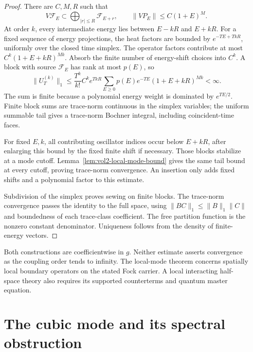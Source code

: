 \begin{proof}
There are \(C,M,R\) such that
\[
 V\mathcal F_E\subset\bigoplus_{|r|\leq R}\mathcal F_{E+r},
 \qquad\|VP_E\|\leq C(1+E)^M.
\]
At order \(k\), every intermediate energy lies between
\(E-kR\) and \(E+kR\). For a fixed sequence of energy projections,
the heat factors are bounded by \(e^{-TE+TkR}\), uniformly over
the closed time simplex. The operator factors contribute at most
\(C^k(1+E+kR)^{Mk}\). Absorb the finite number of energy-shift
choices into \(C^k\). A block with source \(\mathcal F_E\)
has rank at most \(p(E)\), so
\begin{equation}\label{eq:vol2-local-dyson-tail}
 \|U_T^{(k)}\|_1
 \leq\frac{T^k}{k!}C^k e^{TkR}
        \sum_{E\geq0}p(E)e^{-TE}(1+E+kR)^{Mk}<\infty.
\end{equation}
The sum is finite because a polynomial energy weight is dominated
by \(e^{TE/2}\). Finite block sums are trace-norm continuous in
the simplex variables; the uniform summable tail gives a trace-norm
Bochner integral, including coincident-time faces.

For fixed \(E,k\), all contributing oscillator indices occur
below \(E+kR\), after enlarging this bound by the fixed finite
shift if necessary. Those blocks stabilize at a mode cutoff.
Lemma~\ref{lem:vol2-local-mode-bound} gives the same tail bound at
every cutoff, proving trace-norm convergence. An insertion only adds
fixed shifts and a polynomial factor to this estimate.

Subdivision of the simplex proves sewing on finite blocks.
The trace-norm convergence passes the identity to the full space,
using \(\|BC\|_1\leq\|B\|_1\|C\|\) and boundedness of each
trace-class coefficient. The free partition function is the
nonzero constant denominator. Uniqueness follows from the density
of finite-energy vectors.
\end{proof}

Both constructions are coefficientwise in \(g\). Neither estimate
asserts convergence as the coupling order tends to infinity.
The local-mode theorem concerns spatially local boundary operators
on the stated Fock carrier. A local interacting half-space theory
also requires its supported counterterms and quantum master equation.

\section{The cubic mode and its spectral obstruction}

